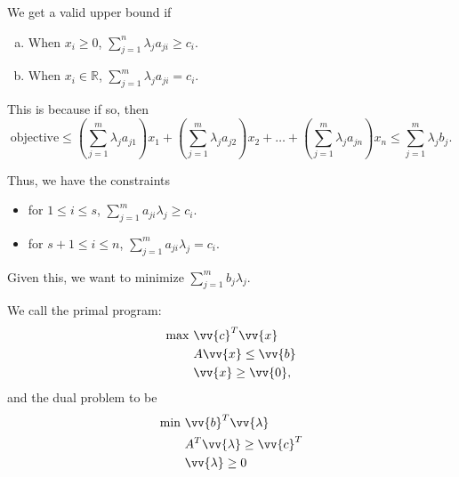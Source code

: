 We get a valid upper bound if 
\begin{enumerate}[(a)]
    \item When \(x_i \ge 0\), \(\sum_{j=1}^n \lambda _j a_{ji} \ge c_i \). 
    \item When \(x_i \in \mathbb{R} \), \(\sum_{j=1}^m \lambda _j a_{ji} = c_i \).    
\end{enumerate}

This is because if so, then 
\[
    \text{objective} \le \left( \sum_{j=1}^m \lambda _j a_{j1}  \right) x_1 + \left( \sum_{j=1}^m \lambda _j a_{j2}  \right) x_2 + \dots + \left( \sum_{j=1}^m \lambda _j a_{jn}  \right) x_n \le \sum_{j=1}^m \lambda _j b_j.
\]

Thus, we have the constraints 
\begin{itemize}
    \item for \(1 \le i \le s\), \(\sum_{j=1}^m a_{ji} \lambda _j \ge c_i \). 
    \item for \(s + 1 \le i \le n\), \(\sum_{j=1}^m a_{ji} \lambda _j = c_i \).  
\end{itemize}
Given this, we want to minimize \(\sum_{j=1}^m b_j \lambda _j \).

We call the primal program:
\[
    \begin{aligned}
        \max~ & \vv{c}^T \vv{x}  \\
            & A \vv{x} \le \vv{b}  \\
            & \vv{x} \ge \vv{0},
    \end{aligned}
\]
and the dual problem to be 
\[
    \begin{aligned}
        \min~ & \vv{b}^T \vv{\lambda }  \\
            & A^T \vv{\lambda } \ge \vv{c}^T  \\
            & \vv{\lambda } \ge 0 
    \end{aligned}
\]

